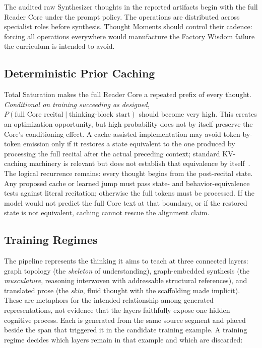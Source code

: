 \noindent The audited raw Synthesizer thoughts in the reported artifacts begin
with the full Reader Core under the prompt policy. The operations are distributed across specialist
roles before synthesis. Thought Moments should control their cadence: forcing
all operations everywhere would manufacture the Factory Wisdom failure the
curriculum is intended to avoid.


\subsection{Deterministic Prior Caching}
\label{sec:identity-caching}

Total Saturation makes the full Reader Core a repeated prefix of every thought.
\emph{Conditional on training succeeding as designed},
$P(\text{full Core recital} \mid \text{thinking-block start})$ should become very high. This
creates an optimization opportunity, but high probability does not by itself
preserve the Core's conditioning effect. A cache-assisted implementation may
avoid token-by-token emission only if it restores a state equivalent to the one
produced by processing the full recital after the actual preceding context;
standard KV-caching machinery is relevant but does not establish that
equivalence by itself~\cite{kwon2023efficient}. The logical recurrence remains:
every thought begins from the post-recital state. Any proposed cache or learned
jump must pass state- and behavior-equivalence tests against literal recitation;
otherwise the full tokens must be processed. If the model would not predict the
full Core text at that boundary, or if the restored state is not equivalent,
caching cannot rescue the alignment claim.

\subsection{Training Regimes}\label{sec:training-regimes}

The pipeline represents the thinking it aims to teach at three connected
layers: graph topology (the \emph{skeleton} of understanding), graph-embedded
synthesis (the \emph{musculature}, reasoning interwoven with addressable
structural references), and translated prose (the \emph{skin}, fluid thought
with the scaffolding made implicit). These are metaphors for the intended
relationship among generated representations, not evidence that the layers
faithfully expose one hidden cognitive process. Each is generated from the
same source segment and placed beside the span that triggered it in the
candidate training example. A training regime decides which layers remain
in that example and which are discarded:

